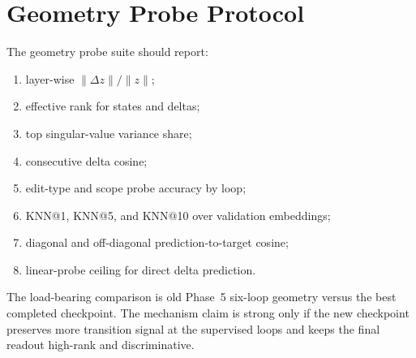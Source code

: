 \section{Geometry Probe Protocol}
\label{app:geometry_probes}

The geometry probe suite should report:
\begin{enumerate}
    \item layer-wise $\|\Delta z\|/\|z\|$;
    \item effective rank for states and deltas;
    \item top singular-value variance share;
    \item consecutive delta cosine;
    \item edit-type and scope probe accuracy by loop;
    \item KNN@1, KNN@5, and KNN@10 over validation embeddings;
    \item diagonal and off-diagonal prediction-to-target cosine;
    \item linear-probe ceiling for direct delta prediction.
\end{enumerate}

The load-bearing comparison is old Phase~5 six-loop geometry versus the
best completed  checkpoint.  The mechanism
claim is strong only if the new checkpoint preserves more transition
signal at the supervised loops and keeps the final readout high-rank and
discriminative.
